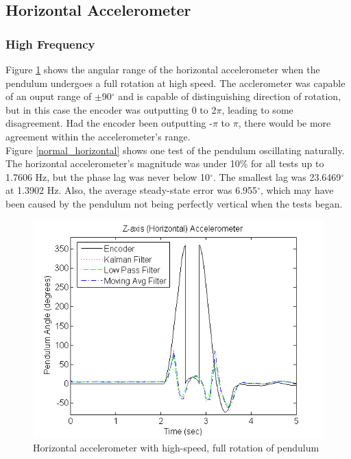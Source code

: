 \documentclass{article}
\theoremstyle{plain}
\theoremstyle{definition}
\theoremstyle{remark}
\begin{document}
\subsection{Horizontal Accelerometer}

\subsubsection{High Frequency}

Figure \ref{full_horizontal} shows the angular range of the horizontal accelerometer when the pendulum undergoes a full rotation at high speed. The acclerometer was capable of an ouput range of $\pm$90$^{\circ}$ and is capable of distinguishing direction of rotation, but in this case the encoder was outputting 0 to 2$\pi$, leading to  some disagreement. Had the encoder been outputting -$\pi$ to $\pi$, there would be more agreement within the accelerometer's range.\\

Figure \ref{normal_horizontal} shows one test of the pendulum oscillating naturally. The horizontal accelerometer's magnitude was under 10\% for all tests up to 1.7606 Hz, but the phase lag was never below 10$^{\circ}$. The smallest lag was 23.6469$^{\circ}$ at 1.3902 Hz. Also, the average steady-state error was 6.955$^{\circ}$, which may have been caused by the pendulum not being perfectly vertical when the tests began.\\ 

\begin{figure}[hbt]
\begin{center}
\includegraphics[width = 12cm]{FullRotation_Horizontal.png}
\caption{Horizontal accelerometer with high-speed, full rotation of pendulum}
\label{full_horizontal}
\end{center}
\end{figure}
\end{document}
